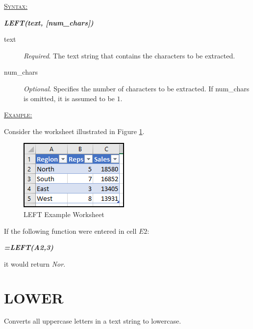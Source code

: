 \begin{addmargin}[1cm]{0cm}
	
	\medskip
	\underline{\textsc{Syntax:}}
	\medskip
	
	{\color{Syntax}
		\noindent\textbf{\textit{LEFT(text, [num\_chars])}}
	}
	
	\begin{description}
		\item[text] \textit{Required}. The text string that contains the characters to be extracted.
		\item[num\_chars] \textit{Optional}. Specifies the number of characters to be extracted. If num\_chars is omitted, it is assumed to be $ 1 $.
	\end{description}

	\medskip
	\noindent\underline{\textsc{Example:}}
	\medskip
	
	\noindent Consider the worksheet illustrated in Figure \ref{apa:lef}.
	
	\begin{figure}[H]
		\centering
		\includegraphics[width=\maxwidth{.45\linewidth}]{gfx/apa_fig01}
		\caption{LEFT Example Worksheet}
		\label{apa:lef}
	\end{figure}
	
	\noindent If the following function were entered in cell $ E2 $:
	
	{\color{Syntax}
		\textit{\textbf{=LEFT(A2,3)}}
	}
	
	\noindent it would return \textit{Nor}.

\end{addmargin}

\section{LOWER}

Converts all uppercase letters in a text string to lowercase.

